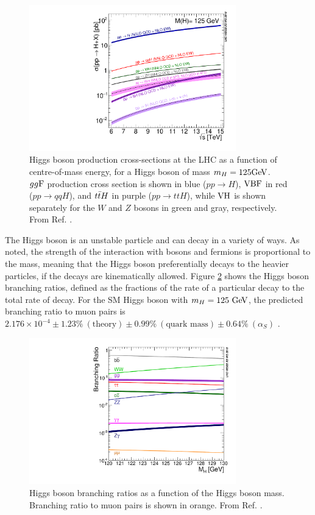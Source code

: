 \begin{figure}[h]
  \centering
  \includegraphics[width=0.8\textwidth]{figures/theory/HiggsProduction}
  \caption[Higgs boson production cross-sections at the LHC.]{Higgs boson production
  cross-sections at the LHC as a function of centre-of-mass energy, for a Higgs boson
  of mass $m_H = 125 \text{Ge\kern -0.1em V}$. $gg\text{F}$ production cross section is shown in blue
  ($pp \rightarrow H$), $\text{VBF}$ in red ($pp \rightarrow qqH$), and $t\bar{t} H$ in purple
  ($pp \rightarrow ttH$), while $\text{VH}$ is shown separately for the $W$ and $Z$ bosons
  in green and gray, respectively. From Ref. \cite{deFlorian:2016spz}.}
   \label{fig:the:prod}
\end{figure}

The Higgs boson is an unstable particle and can decay in a variety of ways. As noted,
the strength of the interaction with bosons and fermions is proportional to the mass,
meaning that the Higgs boson preferentially decays to the heavier particles, if the decays
are kinematically allowed. Figure \ref{fig:the:decay} shows the Higgs boson branching
ratios, defined as the fractions of the rate of a particular decay to the total
rate of decay. For the SM Higgs boson with $m_H = 125~\text{Ge\kern -0.1em V}$, the predicted branching ratio
to muon pairs is $2.176 \times 10^{-4}
\pm 1.23\%~(\text{theory})
\pm 0.99\%~(\text{quark mass})
\pm 0.64\%~(\alpha_S)$ \cite{deFlorian:2016spz}. 

\begin{figure}[h]
  \centering
  \includegraphics[width=0.8\textwidth]{figures/theory/HiggsDecay}
  \caption[Higgs boson branching ratios.]{Higgs boson branching ratios as a function
  of the Higgs boson mass. Branching ratio to muon pairs is shown in orange.
  From Ref. \cite{deFlorian:2016spz}.}
   \label{fig:the:decay}
\end{figure}

